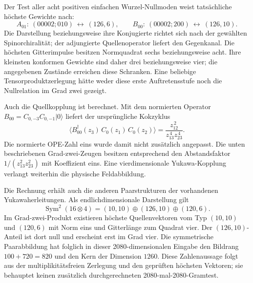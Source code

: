 Der Test aller acht positiven einfachen Wurzel-Nullmoden weist tatsächliche höchste Gewichte nach:
\begin{equation}
A_{01}:\ (00002;010)\ \longleftrightarrow\ (126,6),\qquad
B_{00}:\ (00002;200)\ \longleftrightarrow\ (126,10).
\end{equation}
Die Darstellung beziehungsweise ihre Konjugierte richtet sich nach der gewählten Spinorchiralität; der adjungierte Quellenoperator liefert den Gegenkanal. Die höchsten Gitterimpulse besitzen Normquadrat sechs beziehungsweise acht. Ihre kleinsten konformen Gewichte sind daher drei beziehungsweise vier; die angegebenen Zustände erreichen diese Schranken. Eine beliebige Tensorproduktzerlegung hätte weder diese erste Auftretensstufe noch die Nullrelation im Grad zwei gezeigt.

Auch die Quellkopplung ist berechnet. Mit dem normierten Operator $B_{00}=C_{0,-3}C_{0,-1}|0\rangle$ liefert der ursprüngliche Kokzyklus
\begin{equation}\label{eq:nativemajoranacoupling}
\boxed{\langle B_{00}^{\dagger}(z_3)\,C_0(z_1)\,C_0(z_2)\rangle
=\frac{z_{12}^{\,2}}{z_{13}^{\,4}z_{23}^{\,4}}.}
\end{equation}
Die normierte OPE-Zahl eins wurde damit nicht zusätzlich angepasst. Die unten beschriebenen Grad-zwei-Zeugen besitzen entsprechend den Abstandsfaktor $1/(z_{13}^2z_{23}^2)$ mit Koeffizient eins. Eine vierdimensionale Yukawa-Kopplung verlangt weiterhin die physische Feldabbildung.


Die Rechnung erhält auch die anderen Paarstrukturen der vorhandenen Yukawaherleitungen. Als endlichdimensionale Darstellung gilt
\begin{equation}
\operatorname{Sym}^2(16\otimes4)
=(10,10)\oplus(126,10)\oplus(120,6).
\end{equation}
Im Grad-zwei-Produkt existieren höchste Quellenvektoren vom Typ $(10,10)$ und $(120,6)$ mit Norm eins und Gitterlänge zum Quadrat vier. Der $(126,10)$-Anteil ist dort null und erscheint erst im Grad vier. Die symmetrische Paarabbildung hat folglich in dieser 2080-dimensionalen Eingabe den Bildrang $100+720=820$ und den Kern der Dimension $1260$. Diese Zahlenaussage folgt aus der multiplikitätsfreien Zerlegung und den geprüften höchsten Vektoren; sie behauptet keinen zusätzlich durchgerechneten 2080-mal-2080-Gramtest.

